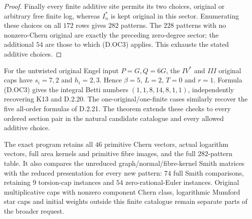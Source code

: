 \begin{proof}
Finally every finite additive site permits its two choices,
original or arbitrary free finite log, whereas $I_n^*$ is
kept original in this sector. Enumerating these choices
on all $172$ rows gives $282$ patterns. The $228$ patterns
with no nonzero-Chern original are exactly the preceding
zero-degree sector; the additional $54$ are those to which
(D.OC3) applies. This exhausts the stated additive choices.
\end{proof}

For the untwisted original Engel input $P=G,Q=6G$, the
$IV^*$ and $III$ original caps have $s_i=7,2$ and
$h_i=2,3$. Hence $\beta=5$, $L=2$, $T=0$ and $r=1$.
Formula (D.OC3) gives the integral Betti numbers
$(1,1,8,14,8,1,1)$, independently recovering K13 and
D.2.20. The one-original/one-finite cases similarly recover
the five all-order formulas of D.2.21. The theorem extends
these checks to every ordered section pair in the natural
candidate catalogue and every allowed additive choice.

The exact program 
retains all $46$ primitive Chern vectors, actual logarithm
vectors, full area kernels and primitive fibre images,
and the full $282$-pattern table. It also compares the
unreduced graph/normal/fibre-kernel Smith matrices with
the reduced presentation for every new pattern: $74$ full
Smith comparisons, retaining $9$ torsion-cap instances and
$54$ zero-rational-Euler instances. Original multiplicative caps with nonzero
component Chern class, logarithmic Mumford star caps and
initial weights outside this finite catalogue remain
separate parts of the broader request.
